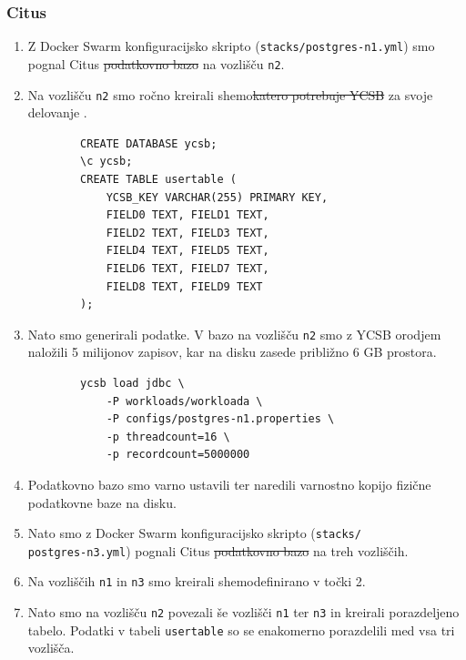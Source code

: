 \documentclass[a4paper, 12pt]{book}
\providecommand{\DIFaddtex}[1]{{\protect\color{blue}\uwave{#1}}} %
\providecommand{\DIFdeltex}[1]{{\protect\color{red}\sout{#1}}}                      %
\providecommand{\DIFaddbegin}{} %
\providecommand{\DIFaddend}{} %
\providecommand{\DIFdelbegin}{} %
\providecommand{\DIFdelend}{} %
\providecommand{\DIFadd}[1]{\texorpdfstring{\DIFaddtex{#1}}{#1}} %
\providecommand{\DIFdel}[1]{\texorpdfstring{\DIFdeltex{#1}}{}} %
\newcommand{\DIFscaledelfig}{0.5}
\newlength{\DIFdelgraphicswidth} %
\newlength{\DIFdelgraphicsheight} %
\newcommand{\DIFaddincludegraphics}[2][]{{\color{blue}\fbox{\DIFOincludegraphics[#1]{#2}}}} %
\newcommand{\DIFdelincludegraphics}[2][]{%
\sbox{\DIFdelgraphicsbox}{\DIFOincludegraphics[#1]{#2}}%
\settoboxwidth{\DIFdelgraphicswidth}{\DIFdelgraphicsbox} %
\settoboxtotalheight{\DIFdelgraphicsheight}{\DIFdelgraphicsbox} %
\scalebox{\DIFscaledelfig}{%
\parbox[b]{\DIFdelgraphicswidth}{\usebox{\DIFdelgraphicsbox}\\[-\baselineskip] \rule{\DIFdelgraphicswidth}{0em}}\llap{\resizebox{\DIFdelgraphicswidth}{\DIFdelgraphicsheight}{%
\setlength{\unitlength}{\DIFdelgraphicswidth}%
\begin{picture}(1,1)%
\thicklines\linethickness{2pt} %
{\color[rgb]{1,0,0}\put(0,0){\framebox(1,1){}}}%
{\color[rgb]{1,0,0}\put(0,0){\line( 1,1){1}}}%
{\color[rgb]{1,0,0}\put(0,1){\line(1,-1){1}}}%
\end{picture}%
}\hspace*{3pt}}} %
} %
\DeclareRobustCommand{\DIFaddbegin}{\DIFOaddbegin \let\includegraphics\DIFaddincludegraphics} %
\DeclareRobustCommand{\DIFaddend}{\DIFOaddend \let\includegraphics\DIFOincludegraphics} %
\DeclareRobustCommand{\DIFdelbegin}{\DIFOdelbegin \let\includegraphics\DIFdelincludegraphics} %
\DeclareRobustCommand{\DIFdelend}{\DIFOaddend \let\includegraphics\DIFOincludegraphics} %
\begin{document}
\subsubsection{Citus}
\begin{enumerate}
    \item Z Docker Swarm konfiguracijsko skripto (\texttt{stacks/postgres-n1.yml}) smo pognal Citus \DIFdelbegin \DIFdel{podatkovno bazo }\DIFdelend na vozlišču \texttt{n2}.
    \item Na vozlišču \texttt{n2} smo ročno kreirali shemo\DIFdelbegin \DIFdel{katero potrebuje YCSB }\DIFdelend \DIFaddbegin \DIFadd{, katero }\DIFaddend za svoje delovanje \DIFaddbegin \DIFadd{potrebuje orodje YCSB}\DIFaddend .
    \begin{listing}[H]
    \begin{verbatim}
        CREATE DATABASE ycsb;
        \c ycsb;
        CREATE TABLE usertable (
            YCSB_KEY VARCHAR(255) PRIMARY KEY,
            FIELD0 TEXT, FIELD1 TEXT,
            FIELD2 TEXT, FIELD3 TEXT,
            FIELD4 TEXT, FIELD5 TEXT,
            FIELD6 TEXT, FIELD7 TEXT,
            FIELD8 TEXT, FIELD9 TEXT
        );
    \end{verbatim}
    \label{code-ycsb-schema-postgres}
    \end{listing}
    \item Nato smo generirali podatke. V bazo na vozlišču \texttt{n2} smo z YCSB orodjem naložili 5 milijonov zapisov, kar na disku zasede približno 6 GB prostora.
    \begin{listing}[H]
    \begin{verbatim}
        ycsb load jdbc \
            -P workloads/workloada \
            -P configs/postgres-n1.properties \
            -p threadcount=16 \
            -p recordcount=5000000
    \end{verbatim}
    \label{code-ycsb-load-postgres}
    \end{listing}
    \item Podatkovno bazo smo varno ustavili ter naredili varnostno kopijo fizične podatkovne baze na disku.
    \item Nato smo z Docker Swarm konfiguracijsko skripto (\texttt{stacks/\\postgres-n3.yml}) pognali Citus \DIFdelbegin \DIFdel{podatkovno bazo }\DIFdelend na treh vozliščih.
    \item Na vozliščih \texttt{n1} in \texttt{n3} smo kreirali shemo\DIFaddbegin \DIFadd{, }\DIFaddend definirano v točki 2.
    \item Nato smo na vozlišču \texttt{n2} povezali še vozlišči \texttt{n1} ter \texttt{n3} in kreirali porazdeljeno tabelo. Podatki v tabeli \texttt{usertable} so se enakomerno porazdelili med vsa tri vozlišča.

\end{enumerate}
\end{document}
